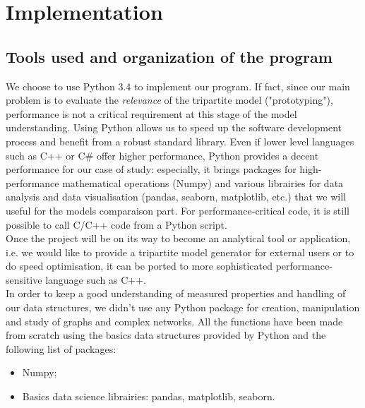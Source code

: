 \documentclass[table]{report}
\begin{document}


\chapter{Implementation}
\minitoc
\section{Tools used and organization of the program}

We choose to use Python 3.4 to implement our program. If fact, since our main problem is to evaluate the \textit{relevance} of the tripartite model ("prototyping"), performance is not a critical requirement at this stage of the model understanding. Using Python allows us to speed up the software development process and benefit from a robust standard library. Even if lower level languages such as C++ or C\# offer higher performance, Python provides a decent performance for our case of study: especially, it brings packages for high-performance mathematical operations (Numpy) and various librairies for data analysis and data visualisation (pandas, seaborn, matplotlib, etc.) that we will useful for the models comparaison part. For performance-critical code, it is still possible to call C/C++ code from a Python script. \\

Once the project will be on its way to become an analytical tool or application, i.e. we would like to provide a tripartite model generator for external users or to do speed optimisation, it can be ported to more sophisticated performance-sensitive language such as C++. \\


In order to keep a good understanding of measured properties and handling of our data structures, we didn't use any Python package for creation, manipulation and study of graphs and complex networks. All the functions have been made from scratch using the basics data structures provided by Python and the following list of packages:
\begin{itemize}[noitemsep]
    \item Numpy;
    \item Basics data science librairies: pandas, matplotlib, seaborn.
\end{itemize}
\end{document}
